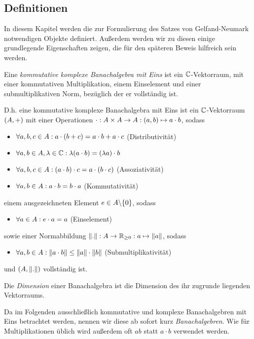\subsection{Definitionen}

In diesem Kapitel werden die zur Formulierung des Satzes von Gelfand-Neumark notwendigen Objekte definiert. Außerdem werden wir zu diesen einige grundlegende Eigenschaften zeigen, die für den späteren Beweis hilfreich sein werden.

\begin{defn}[Banachalgebra]
Eine \emph{kommutative komplexe Banachalgebra mit Eins} ist ein $\mathbb{C}$-Vektorraum, mit einer kommutativen Multiplikation, einem Einselement und einer submultiplikativen Norm, bezüglich der er vollständig ist.

D.h. eine kommutative komplexe Banachalgebra mit Eins ist ein $\mathbb{C}$-Vektorraum $(A, +)$ mit einer Operationen $\cdot: A \times A \to A: (a,b) \mapsto a\cdot b$, sodass
\begin{itemize}
	\item $\forall a,b,c  \in A: a\cdot(b+c) = a\cdot b + a\cdot c$ (Distributivität)
	\item $\forall a,b \in A, \lambda \in \mathbb{C}: \lambda(a\cdot b) = (\lambda a)\cdot b$
	\item $\forall a,b,c \in A: (a\cdot b)\cdot c = a \cdot (b \cdot c)$ (Assoziativität)
	\item $\forall a, b \in A: a\cdot b = b \cdot a$ (Kommutativität)	
\end{itemize}
einem ausgezeichneten Element $e \in A \backslash \{0\}$, sodass
\begin{itemize}
	\item $\forall a \in A: e\cdot a = a$ (Einselement)
\end{itemize}
sowie einer Normabbildung $\left\lVert.\right\rVert: A \to \mathbb{R}_{\geq0}: a \mapsto \left\lVert a\right\rVert$, sodass
\begin{itemize}
	\item $\forall a,b \in A: \left\lVert a \cdot b\right\rVert \leq \left\lVert a\right\rVert \cdot \left\lVert b\right\rVert$ (Submultiplikativität)
\end{itemize}
und $(A, \left\lVert.\right\rVert)$ vollständig ist.

Die \emph{Dimension} einer Banachalgebra ist die Dimension des ihr zugrunde liegenden Vektorraums.
\end{defn}

\begin{bem}
Da im Folgenden ausschließlich kommutative und komplexe Banachalgebren mit Eins betrachtet werden, nennen wir diese ab sofort kurz \emph{Banachalgebren}. Wie für Multiplikationen üblich wird außerdem oft $ab$ statt $a \cdot b$ verwendet werden.
\end{bem}

